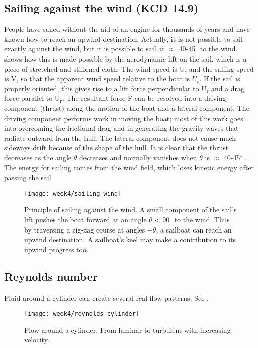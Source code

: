 \subsection[Sailing against the wind]{Sailing against the wind (KCD 14.9)}
People have sailed without the aid of an engine for thousands of years and have known
how to reach an upwind destination. Actually, it is not possible to sail exactly against the
wind, but it is possible to sail at $\approx$ 40-45$^\circ$ to the wind.  shows
how this is made possible by the aerodynamic lift on the sail, which is a piece of stretched and stiffened
cloth. The wind speed is U, and the sailing speed is V, so that the apparent wind speed relative
to the boat is $U_r$. If the sail is properly oriented, this gives rise to a lift force perpendicular
to U$_\text{r}$ and a drag force parallel to U$_\text{r}$. The resultant force F can be resolved into a driving
component (thrust) along the motion of the boat and a lateral component. The driving
component performs work in moving the boat; most of this work goes into overcoming
the frictional drag and in generating the gravity waves that radiate outward from the hull.
The lateral component does not cause much sideways drift because of the shape of the
hull. It is clear that the thrust decreases as the angle $\theta$ decreases and normally vanishes
when $\theta$ is $\approx$ 40-45$^\circ$ . The energy for sailing comes from the wind field, which loses kinetic
energy after passing the sail.

\begin{figure}[!h]
    \centering
    \texttt{[image: week4/sailing-wind]}\\
    \caption{Principle of sailing against the wind. A small component of the sail’s lift pushes the boat forward at an angle $\theta$ < 90$^\circ$ to the wind. Thus by traversing a zig-zag course at angles $\pm\theta$, a sailboat can reach an upwind destination. A sailboat’s keel may make a contribution to its upwind progress too.}
    \label{fig:sailing-wind}
\end{figure}

\newpage
\subsection{Reynolds number}
Fluid around a cylinder can create several real flow patterns. See .

\begin{figure}[p]
    \centering
    \texttt{[image: week4/reynolds-cylinder]}\\
    \caption{Flow around a cylinder. From laminar to turbulent with increasing velocity.}
    \label{fig:reynolds-cylinder}
\end{figure}

